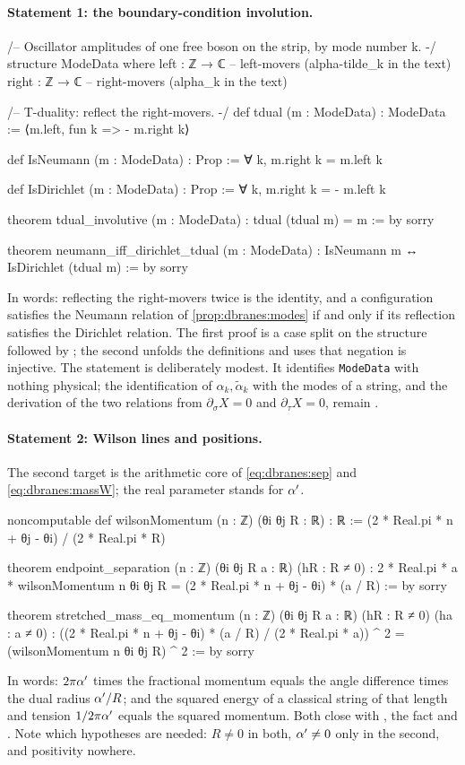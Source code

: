 \paragraph{Statement 1: the boundary-condition involution.}
\begin{leancode}
/-- Oscillator amplitudes of one free boson on the strip, by mode number k. -/
structure ModeData where
  left  : ℤ → ℂ      -- left-movers  (alpha-tilde_k in the text)
  right : ℤ → ℂ      -- right-movers (alpha_k in the text)

/-- T-duality: reflect the right-movers. -/
def tdual (m : ModeData) : ModeData := ⟨m.left, fun k => - m.right k⟩

def IsNeumann (m : ModeData) : Prop := ∀ k, m.right k = m.left k

def IsDirichlet (m : ModeData) : Prop := ∀ k, m.right k = - m.left k

theorem tdual_involutive (m : ModeData) : tdual (tdual m) = m := by sorry

theorem neumann_iff_dirichlet_tdual (m : ModeData) :
    IsNeumann m ↔ IsDirichlet (tdual m) := by sorry
\end{leancode}
In words: reflecting the right-movers twice is the identity, and a configuration satisfies the
Neumann relation of \cref{prop:dbranes:modes} if and only if its reflection satisfies the
Dirichlet relation. The first proof is a case split on the structure followed by ;
the second unfolds the definitions and uses that negation is injective. The statement is
deliberately modest. It identifies \texttt{ModeData} with nothing physical; the identification
of $\alpha_k,\tilde\alpha_k$ with the modes of a string, and the derivation of the two relations
from $\partial_\sigma X=0$ and $\partial_\tau X=0$, remain \TL.

\paragraph{Statement 2: Wilson lines and positions.} The second target is the arithmetic core of
\eqref{eq:dbranes:sep} and \eqref{eq:dbranes:massW}; the real parameter  stands for $\alpha'$.
\begin{leancode}
noncomputable def wilsonMomentum (n : ℤ) (θi θj R : ℝ) : ℝ :=
  (2 * Real.pi * n + θj - θi) / (2 * Real.pi * R)

theorem endpoint_separation (n : ℤ) (θi θj R a : ℝ) (hR : R ≠ 0) :
    2 * Real.pi * a * wilsonMomentum n θi θj R
      = (2 * Real.pi * n + θj - θi) * (a / R) := by sorry

theorem stretched_mass_eq_momentum (n : ℤ) (θi θj R a : ℝ)
    (hR : R ≠ 0) (ha : a ≠ 0) :
    ((2 * Real.pi * n + θj - θi) * (a / R) / (2 * Real.pi * a)) ^ 2
      = (wilsonMomentum n θi θj R) ^ 2 := by sorry
\end{leancode}
In words: $2\pi\alpha'$ times the fractional momentum equals the angle difference times the dual
radius $\alpha'/R$; and the squared energy of a classical string of that length and tension
$1/2\pi\alpha'$ equals the squared momentum. Both close with , the fact
 and . Note which hypotheses are needed: $R\ne0$ in
both, $\alpha'\ne0$ only in the second, and positivity nowhere.

